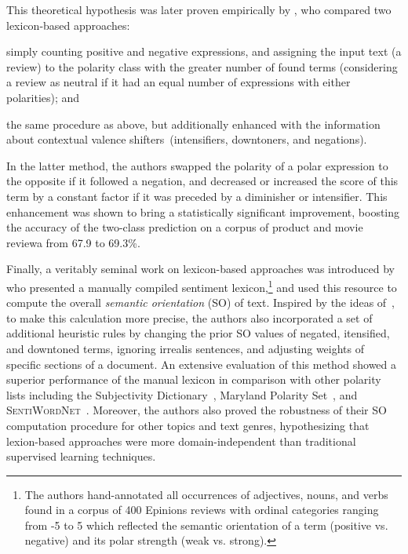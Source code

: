 This theoretical hypothesis was later proven empirically by
\citet{Kennedy:06}, who compared two lexicon-based approaches:
\begin{inparaenum}[(i)]
\item simply counting positive and negative expressions, and assigning
  the input text (a review) to the polarity class with the greater
  number of found terms (considering a review as neutral if it had an
  equal number of expressions with either polarities); and
\item the same procedure as above, but additionally enhanced with the
  information about contextual valence shifters~(intensifiers,
  downtoners, and negations).
\end{inparaenum}
In the latter method, the authors swapped the polarity of a polar
expression to the opposite if it followed a negation, and decreased or
increased the score of this term by a constant factor if it was
preceded by a diminisher or intensifier.  This enhancement was shown
to bring a statistically significant improvement, boosting the
accuracy of the two-class prediction on a corpus of product and movie
reviewa from 67.9 to 69.3\%.


Finally, a veritably seminal work on lexicon-based approaches was
introduced by~\citet{Taboada:11} who presented a manually compiled
sentiment lexicon,\footnote{The authors hand-annotated all occurrences
  of adjectives, nouns, and verbs found in a corpus of 400 Epinions
  reviews with ordinal categories ranging from -5 to 5 which reflected
  the semantic orientation of a term (positive vs. negative) and its
  polar strength (weak vs. strong).} and used this resource to compute
the overall \emph{semantic orientation} (SO) of text.  Inspired by the
ideas of~\citet{Polanyi:06}, to make this calculation more precise,
the authors also incorporated a set of additional heuristic rules by
changing the prior SO values of negated, itensified, and downtoned
terms, ignoring irrealis sentences, and adjusting weights of specific
sections of a document.  An extensive evaluation of this method showed
a superior performance of the manual lexicon in comparison with other
polarity lists including the Subjectivity Dictionary~\cite{Wilson:05},
Maryland Polarity Set~\cite{Mohammad:09}, and
\textsc{SentiWordNet}~\cite{Esuli:06c}.  Moreover, the authors also
proved the robustness of their SO computation procedure for other
topics and text genres, hypothesizing that lexion-based approaches
were more domain-independent than traditional supervised learning
techniques.


